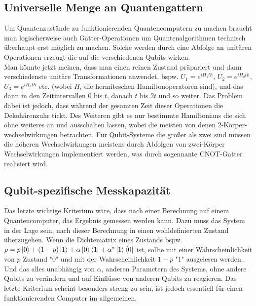\documentclass[11pt]{article}
\begin{document}
\subsection{Universelle Menge an Quantengattern}
Um Quantenzustände zu funktionierenden Quantencomputern zu machen braucht man logischerweise auch Gatter-Operationen um 
Quantenalgorithmen technisch überhaupt erst möglich zu machen. Solche werden durch eine Abfolge an unitären Operationen erzeugt
die auf die verschiedenen Qubits wirken.\\
Man könnte jetzt meinen, dass man einen reinen Zustand präpariert und dann verschiedenste unitäre Transformationen anwendet, 
bspw. $U_1 = e^{iH_1t\hbar}$, $U_2 = e^{iH_2t\hbar}$, $U_3 = e^{iH_3t\hbar}$ etc. (wobei $H_i$ die hermiteschen 
Hamiltonoperatoren sind), und das dann in den Zeitintervallen 0 bis $t$, danach $t$ bis $2t$ und so weiter. Das Problem 
dabei ist jedoch, dass während der gesamten Zeit dieser Operationen die Dekohärenzuhr tickt. Des Weiteren gibt es nur 
bestimmte Hamiltonians die sich ohne weiteres an und ausschalten lassen, wobei die meisten von denen 2-Körper-wechselwirkungen
betrachten. Für Qubit-Systeme die größer als zwei sind müssen die höheren Wechselwirkungen meistens durch Abfolgen von zwei-Körper
Wechselwirkungen implementiert werden, was durch sogennante CNOT-Gatter realisiert wird.
\subsection{Qubit-spezifische Messkapazität}
Das letzte wichtige Kriterium wäre, dass nach einer Berechnung auf einem Quantencomputer, das Ergebnis gemessen werden kann.
Dazu muss das System in der Lage sein, nach dieser Berechnung in einen wohldefinierten Zustand überzugehen. Wenn die Dichtematrix
eines Zustands bspw. $\rho = p\ket{0} + (1-p)\ket{1} + \alpha\ket{0}\bra{1} + \alpha^*\ket{1}\bra{0}$ ist, sollte mit einer
Wahrscheinlichkeit von $p$ Zustand "0" und mit der Wahrscheinlichkeit $1-p$ "1" ausgelesen werden. Und das alles unabhängig von 
$\alpha$, anderen Parametern des Systems, ohne andere Qubits zu verändern und auf Einflüsse von anderen Qubits zu reagieren.
Das letzte Kriterium scheint besonders streng zu sein, ist jedoch essentiell für einen funktionierenden Computer im allgemeinen.
\end{document}
